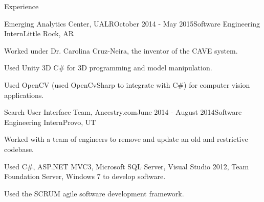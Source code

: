 \documentclass{resume} %
\begin{document}
\begin{rSection}{Experience}
  \begin{rSubsection}{Emerging Analytics Center, UALR}{October 2014 - May 2015}{Software Engineering Intern}{Little Rock, AR}
  \item Worked under Dr. Carolina Cruz-Neira, the inventor of the CAVE system.
  \item Used Unity 3D C\# for 3D programming and model manipulation.
  \item Used OpenCV (used OpenCvSharp to integrate with C\#) for computer vision applications.
  \end{rSubsection}

  \begin{rSubsection}{Search User Interface Team, Ancestry.com}{June 2014 - August 2014}{Software Engineering Intern}{Provo, UT}
  \item Worked with a team of engineers to remove and update an old and restrictive codebase.
  \item Used C\#, ASP.NET MVC3, Microsoft SQL Server, Visual Studio 2012, Team Foundation Server, Windows 7 to develop software.
  \item Used the SCRUM agile software development framework.
  \end{rSubsection}

\end{rSection}

\end{document}
